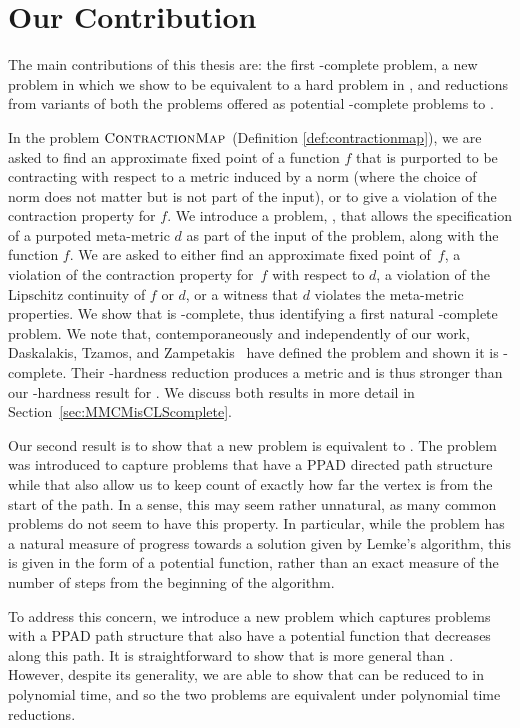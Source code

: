 \section{Our Contribution}

The main contributions of this thesis are: the first \CLS-complete problem, a new problem \EOPL in \CLS which we show to be equivalent to a hard problem in \CLS, and reductions from variants of both the problems offered as potential \CLS-complete problems to \EOPL.

In the problem $\textsc{ContractionMap}$ (Definition \ref{def:contractionmap}), we
are asked to find an approximate fixed point of a function $f$ that is purported
to be contracting with respect to a metric induced by a norm (where the choice of
norm does not matter but is not part of the input), or to give a violation of
the contraction property for $f$. We introduce a problem, \MMCM, that allows
the specification of a purpoted meta-metric $d$ as part of the input of the problem,
along with the function $f$. We are asked to either find an approximate fixed
point of~$f$, a violation of the contraction property for~$f$ with respect to
$d$, a violation of the Lipschitz continuity of $f$ or $d$, or a witness that $d$ violates 
the meta-metric properties.
We show that \MMCM is \CLS-complete, thus identifying a first natural \CLS-complete problem.
We note that, contemporaneously and independently of our work, Daskalakis, Tzamos, and
Zampetakis~\cite{DTZ17} have defined the problem \MBanach and shown it is \CLS-complete.
Their \CLS-hardness reduction produces a metric and 
is thus stronger than our \CLS-hardness result for \MMCM. 
We discuss both results in more detail in Section~\ref{sec:MMCMisCLScomplete}.

Our second result is to show that a new problem \EOPL is equivalent to \EOML.
The \EOML problem was introduced to capture problems that have a PPAD directed
path structure while that also allow us to keep count of exactly how far the vertex is from
the start of the path. In a sense, this may seem rather unnatural, as many common
problems do not seem to have this property. In particular, while the \PLCP problem
has a natural measure of progress towards a solution given by Lemke's algorithm, 
this is given in the form of a potential function, rather than an exact measure
of the number of steps from the beginning of the algorithm.

To address this concern, we introduce a new problem \EOPL which captures problems with a
PPAD path structure that also have a potential function that decreases
along this path. It is straightforward to show that \EOPL is more general than
\EOML. However, despite its generality, we are able to show that \EOPL can
be reduced to \EOML in polynomial time, and so the two problems are equivalent
under polynomial time reductions.


